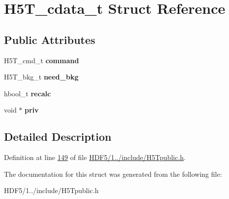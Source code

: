 \hypertarget{struct_h5_t__cdata__t}{}\section{H5\+T\+\_\+cdata\+\_\+t Struct Reference}
\label{struct_h5_t__cdata__t}
\subsection*{Public Attributes}
\begin{DoxyCompactItemize}
\item 
\mbox{\label{struct_h5_t__cdata__t_a83c24860fc68de578d3ca1243ffd2af6}} 
H5\+T\+\_\+cmd\+\_\+t {\bfseries command}
\item 
\mbox{\label{struct_h5_t__cdata__t_a4e86a3cb3109066995de3bd21ce8198c}} 
H5\+T\+\_\+bkg\+\_\+t {\bfseries need\+\_\+bkg}
\item 
\mbox{\label{struct_h5_t__cdata__t_ae49da01351e4836783ae7c0089d4c5cb}} 
hbool\+\_\+t {\bfseries recalc}
\item 
\mbox{\label{struct_h5_t__cdata__t_a599417d5452077a82c232baf624706b6}} 
void $\ast$ {\bfseries priv}
\end{DoxyCompactItemize}


\subsection{Detailed Description}


Definition at line \hyperlink{_h_d_f5_21_810_81_2include_2_h5_tpublic_8h_source_l00149}{149} of file \hyperlink{_h_d_f5_21_810_81_2include_2_h5_tpublic_8h_source}{H\+D\+F5/1../include/\+H5\+Tpublic.\+h}.



The documentation for this struct was generated from the following file\+:\begin{DoxyCompactItemize}
\item 
H\+D\+F5/1../include/\+H5\+Tpublic.\+h\end{DoxyCompactItemize}
